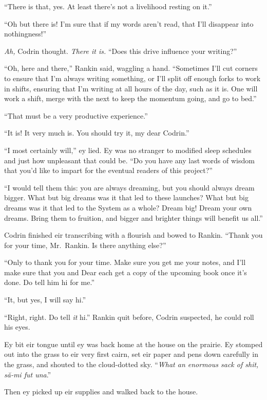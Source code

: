 ``There is that, yes. At least there's not a livelihood resting on it.''

``Oh but there is! I'm sure that if my words aren't read, that I'll disappear into nothingness!''

\emph{Ah,} Codrin thought. \emph{There it is.} ``Does this drive influence your writing?''

``Oh, here and there,'' Rankin said, waggling a hand. ``Sometimes I'll cut corners to ensure that I'm always writing something, or I'll split off enough forks to work in shifts, ensuring that I'm writing at all hours of the day, such as it is. One will work a shift, merge with the next to keep the momentum going, and go to bed.''

``That must be a very productive experience.''

``It is! It very much is. You should try it, my dear Codrin.''

``I most certainly will,'' ey lied. Ey was no stranger to modified sleep schedules and just how unpleasant that could be. ``Do you have any last words of wisdom that you'd like to impart for the eventual readers of this project?''

``I would tell them this: you are always dreaming, but you should always dream bigger. What but big dreams was it that led to these launches? What but big dreams was it that led to the System as a whole? Dream big! Dream your own dreams. Bring them to fruition, and bigger and brighter things will benefit us all.''

Codrin finished eir transcribing with a flourish and bowed to Rankin. ``Thank you for your time, Mr.~Rankin. Is there anything else?''

``Only to thank you for your time. Make sure you get me your notes, and I'll make sure that you and Dear each get a copy of the upcoming book once it's done. Do tell him hi for me.''

``It, but yes, I will say hi.''

``Right, right. Do tell \emph{it} hi.'' Rankin quit before, Codrin suspected, he could roll his eyes.

Ey bit eir tongue until ey was back home at the house on the prairie. Ey stomped out into the grass to eir very first cairn, set eir paper and pens down carefully in the grass, and shouted to the cloud-dotted sky. ``\emph{What an enormous sack of shit, să-mi fut una}.''

Then ey picked up eir supplies and walked back to the house.

